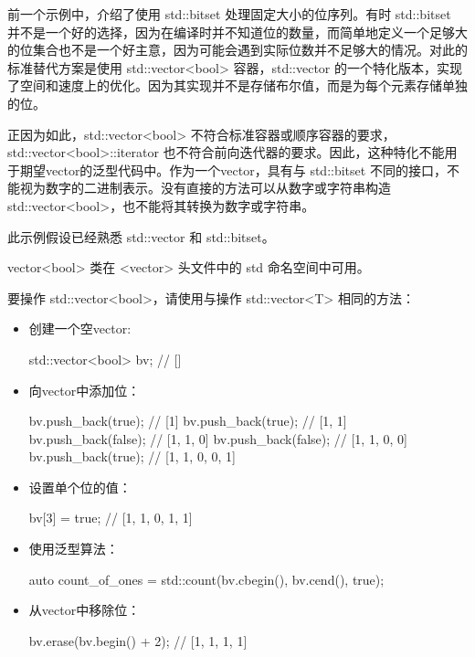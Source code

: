 前一个示例中，介绍了使用 std::bitset 处理固定大小的位序列。有时 std::bitset 并不是一个好的选择，因为在编译时并不知道位的数量，而简单地定义一个足够大的位集合也不是一个好主意，因为可能会遇到实际位数并不足够大的情况。对此的标准替代方案是使用 std::vector<bool> 容器，std::vector 的一个特化版本，实现了空间和速度上的优化。因为其实现并不是存储布尔值，而是为每个元素存储单独的位。

\begin{myNotic}
正因为如此，std::vector<bool> 不符合标准容器或顺序容器的要求，std::vector<bool>::iterator 也不符合前向迭代器的要求。因此，这种特化不能用于期望vector的泛型代码中。作为一个vector，具有与 std::bitset 不同的接口，不能视为数字的二进制表示。没有直接的方法可以从数字或字符串构造 std::vector<bool>，也不能将其转换为数字或字符串。
\end{myNotic}


此示例假设已经熟悉 std::vector 和 std::bitset。

vector<bool> 类在 <vector> 头文件中的 std 命名空间中可用。


要操作 std::vector<bool>，请使用与操作 std::vector<T> 相同的方法：

\begin{itemize}
\item
创建一个空vector:

\begin{cpp}
std::vector<bool> bv; // []
\end{cpp}

\item
向vector中添加位：

\begin{cpp}
bv.push_back(true);  // [1]
bv.push_back(true);  // [1, 1]
bv.push_back(false); // [1, 1, 0]
bv.push_back(false); // [1, 1, 0, 0]
bv.push_back(true);  // [1, 1, 0, 0, 1]
\end{cpp}

\item
设置单个位的值：

\begin{cpp}
bv[3] = true;        // [1, 1, 0, 1, 1]
\end{cpp}

\item
使用泛型算法：

\begin{cpp}
auto count_of_ones = std::count(bv.cbegin(), bv.cend(), true);
\end{cpp}

\item
从vector中移除位：

\begin{cpp}
bv.erase(bv.begin() + 2); // [1, 1, 1, 1]
\end{cpp}
\end{itemize}


